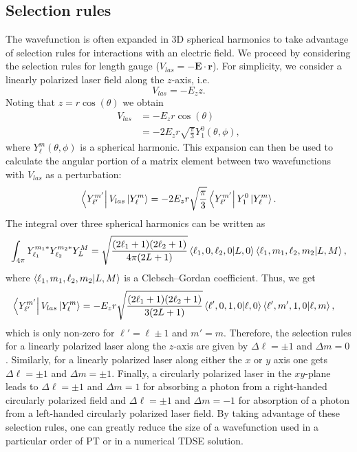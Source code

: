 \subsection{Selection rules} %
\label{sub:selection_rules}
The wavefunction is often expanded in 3D spherical harmonics to take advantage of selection rules for interactions with an electric field. We proceed by considering the selection rules for length gauge ($V_{las}=-\mathbf{E}\cdot \mathbf{r}$). For simplicity, we consider a linearly polarized laser field along the $z$-axis, i.e.
\begin{equation}
    V_{las}=-E_z z.
\end{equation}
Noting that $z=r\cos(\theta)$ we obtain
\begin{align}
    V_{las}&=-E_zr\cos(\theta)\\
    &=-2E_zr\sqrt{\frac{\pi}{3}}Y_1^0(\theta,\phi),
\end{align}
where $Y_\ell^m(\theta,\phi)$ is a spherical harmonic. This expansion can then be used to calculate the angular portion of a matrix element between two wavefunctions with $V_{las}$ as a perturbation: 
\begin{equation}
    \bra{Y_{\ell'}^{m'}}V_{las}\ket{Y_{\ell}^{m}} = -2E_zr\sqrt{\frac{\pi}{3}}\bra{Y_{\ell'}^{m'}}Y_1^0\ket{Y_{\ell}^{m}}.
\end{equation}
The integral over three spherical harmonics can be written as 
\begin{equation}
    \int_{4\pi} Y_{\ell_1}^{m_1*}Y_{\ell_2}^{m_2*}Y_{L}^{M} = \sqrt{\frac{(2\ell_1+1)(2\ell_2+1)}{4\pi(2L+1)}}\bra{\ell_1,0,\ell_2,0}\ket{L,0}\bra{\ell_1,m_1,\ell_2,m_2}\ket{L,M},
\end{equation}
where $\bra{\ell_1,m_1,\ell_2,m_2}\ket{L,M}$ is a Clebsch–Gordan coefficient. Thus, we get
\begin{align}
    \bra{Y_{\ell'}^{m'}}V_{las}\ket{Y_{\ell}^{m}} &= -E_zr\sqrt{\frac{(2\ell_1+1)(2\ell_2+1)}{3(2L+1)}}\bra{\ell',0,1,0}\ket{\ell,0}\bra{\ell',m',1,0}\ket{\ell,m},
\end{align}
which is only non-zero for $\ell' = \ell \pm 1$ and $m'=m$. Therefore, the selection rules for a linearly polarized laser along the $z$-axis are given by $\Delta\ell=\pm1$ and $\Delta m = 0$. Similarly, for a linearly polarized laser along either the $x$ or $y$ axis one gets $\Delta\ell=\pm1$ and $\Delta m = \pm1$. Finally, a circularly polarized laser in the $xy$-plane leads to $\Delta\ell=\pm1$ and $\Delta m = 1$ for absorbing a photon from a right-handed circularly polarized field and $\Delta\ell=\pm1$ and $\Delta m = -1$ for absorption of a photon from a left-handed circularly polarized laser field. By taking advantage of these selection rules, one can greatly reduce the size of a wavefunction used in a particular order of PT or in a numerical TDSE solution.

